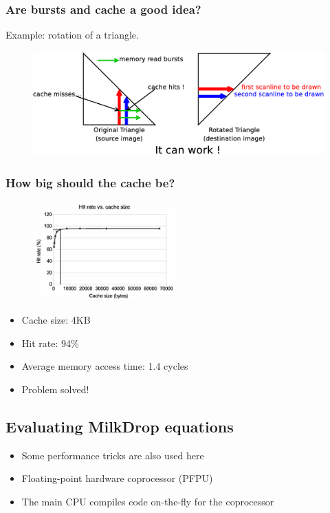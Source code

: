 \documentclass{beamer}
\begin{document}
\frame
{
  \frametitle{Are bursts and cache a good idea?}
  
  Example: rotation of a triangle.
  \begin{figure}[H]
  \includegraphics[height=40mm]{tripattern.eps}
  \end{figure}
}

\frame
{
  \frametitle{How big should the cache be?}
  \begin{figure}[H]
  \includegraphics[height=38mm]{texelcache.eps}
  \end{figure}
  \begin{itemize}
  \item Cache size: 4KB
  \item Hit rate: 94\%
  \item Average memory access time: 1.4 cycles
  \item Problem solved!
  \end{itemize}
}

\subsection{Evaluating MilkDrop equations}
\frame
{
  \begin{center}
  \end{center}
  \begin{itemize}
  \item Some performance tricks are also used here
  \item Floating-point hardware coprocessor (PFPU)
  \item The main CPU compiles code on-the-fly for the coprocessor
  \end{itemize}
}
\end{document}
